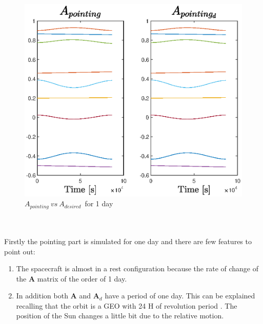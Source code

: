 \documentclass[11pt]{article}
\begin{document}
\begin{minipage}{.5 \textwidth}
\begin{figure} [H]
\centering 
\includegraphics[scale=0.68]{A_poointing.eps}
\caption{ $A_{pointing} \ vs \ A_{desired} $\ for  1 day}
\end{figure}
\end{minipage}\\\\
Firstly the pointing part is simulated  for one day and there are few features to point out:
\begin{enumerate}
   
    \item The spacecraft is almost in a rest configuration because the rate of change of the $ \mathbf{A}$ matrix of the order of 1 day.
   \item In addition both $ \mathbf{A}$ and $ \mathbf{A}_d$ have a period of one day. This can be explained recalling that the orbit is a GEO with 24 H of revolution period . The  position of the Sun changes a little bit due to the relative motion.
\end{enumerate}
\end{document}
